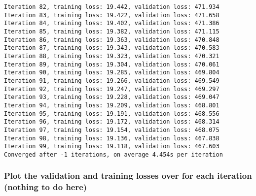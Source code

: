 \documentclass[11pt]{article}
\begin{document}
\begin{Verbatim}[commandchars=\\\{\}]
Iteration 82, training loss: 19.442, validation loss: 471.934
Iteration 83, training loss: 19.422, validation loss: 471.658
Iteration 84, training loss: 19.402, validation loss: 471.386
Iteration 85, training loss: 19.382, validation loss: 471.115
Iteration 86, training loss: 19.363, validation loss: 470.848
Iteration 87, training loss: 19.343, validation loss: 470.583
Iteration 88, training loss: 19.323, validation loss: 470.321
Iteration 89, training loss: 19.304, validation loss: 470.061
Iteration 90, training loss: 19.285, validation loss: 469.804
Iteration 91, training loss: 19.266, validation loss: 469.549
Iteration 92, training loss: 19.247, validation loss: 469.297
Iteration 93, training loss: 19.228, validation loss: 469.047
Iteration 94, training loss: 19.209, validation loss: 468.801
Iteration 95, training loss: 19.191, validation loss: 468.556
Iteration 96, training loss: 19.172, validation loss: 468.314
Iteration 97, training loss: 19.154, validation loss: 468.075
Iteration 98, training loss: 19.136, validation loss: 467.838
Iteration 99, training loss: 19.118, validation loss: 467.603
Converged after -1 iterations, on average 4.454s per iteration
\end{Verbatim}

    \hypertarget{plot-the-validation-and-training-losses-over-for-each-iteration-nothing-to-do-here}{%
\subsubsection{Plot the validation and training losses over for each
iteration (nothing to do
here)}\label{plot-the-validation-and-training-losses-over-for-each-iteration-nothing-to-do-here}}
\end{document}

